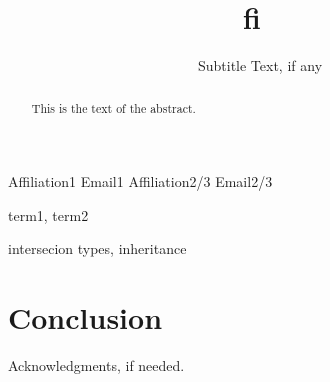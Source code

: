 \documentclass[preprint]{sigplanconf}
\newcommand{\name}{{\bf fi~}}
\begin{document}
\setlength{\pdfpageheight}{\paperheight}
\setlength{\pdfpagewidth}{\paperwidth}


\preprintfooter{\name}                        %

\title{\name}
\subtitle{Subtitle Text, if any}

           {Affiliation1}
           {Email1}
           {Affiliation2/3}
           {Email2/3}

\maketitle

\begin{abstract}
This is the text of the abstract.
\end{abstract}


\terms
term1, term2

\keywords
intersecion types, inheritance









\section{Conclusion}

\appendix



\acks

Acknowledgments, if needed.


\end{document}
